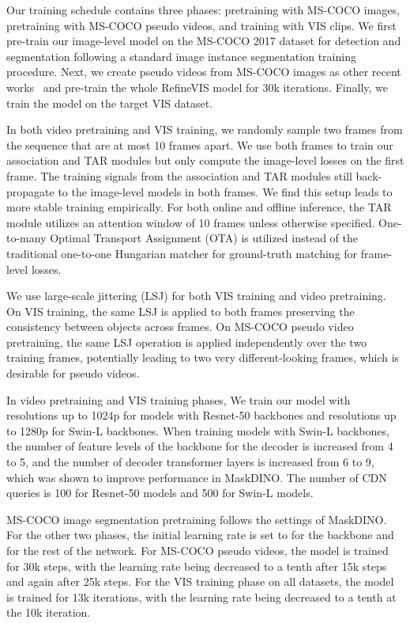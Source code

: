 Our training schedule contains three phases: pretraining with MS-COCO images, pretraining with MS-COCO pseudo videos, and training with VIS clips. We first pre-train our image-level model on the MS-COCO 2017 dataset \cite{mscoco} for detection and segmentation following a standard image instance segmentation training procedure.
Next, we create pseudo videos from MS-COCO images as other recent works~\cite{IDOL,heo2022vita,wu2021seqformer} and pre-train the whole RefineVIS model for 30k iterations. 
Finally, we train the model on the target VIS dataset.

In both video pretraining and VIS training, we randomly sample two frames from the sequence that are at most 10 frames apart.
We use both frames to train our association and TAR modules but only compute the image-level losses on the first frame.
The training signals from the association and TAR modules still back-propagate to the image-level models in both frames.
We find this setup leads to more stable training empirically.
For both online and offline inference, the TAR module utilizes an attention window of 10 frames unless otherwise specified.
One-to-many Optimal Transport Assignment (OTA) is utilized instead of the traditional one-to-one Hungarian matcher for ground-truth matching for frame-level losses.

We use large-scale jittering (LSJ) for both VIS training and video pretraining. On VIS training, the same LSJ is applied to both frames preserving the consistency between objects across frames. On MS-COCO pseudo video pretraining, the same LSJ operation is applied independently over the two training frames, potentially leading to two very different-looking frames, which is desirable for pseudo videos. 

In video pretraining and VIS training phases, We train our model with resolutions up to 1024p for models with Resnet-50 backbones and resolutions up to 1280p for Swin-L backbones. When training models with Swin-L backbones, the number of feature levels of the backbone for the decoder is increased from 4 to 5, and the number of decoder transformer layers is increased from 6 to 9, which was shown to improve performance in MaskDINO.
The number of CDN queries is 100 for Resnet-50 models and 500 for Swin-L models.

MS-COCO image segmentation pretraining follows the settings of MaskDINO.
For the other two phases, the initial learning rate is set to  for the backbone and  for the rest of the network. 
For MS-COCO pseudo videos, the model is trained for 30k steps, with the learning rate being decreased to a tenth after 15k steps and again after 25k steps.
For the VIS training phase on all datasets, the model is trained for 13k iterations, with the learning rate being decreased to a tenth at the 10k iteration.



